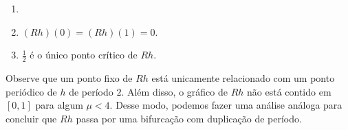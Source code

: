 \begin{proposition}
\begin{enumerate}\item[]
\item $(Rh)(0) = (Rh)(1) = 0$.
\item $\frac{1}{2}$ é o único ponto crítico de $Rh$.
\end{enumerate}
\end{proposition}

Observe que um ponto fixo de $Rh$ está unicamente relacionado com um ponto periódico de $h$ de período $2$. Além disso, o gráfico de $Rh$ não está contido em $[0, 1]$ para algum $\mu < 4$. Desse modo, podemos fazer uma análise análoga para concluir que $Rh$ passa por uma bifurcação com duplicação de período. 



